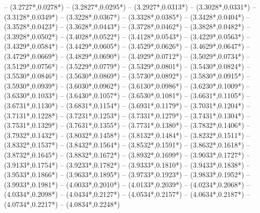{	-- ({3.2727*\dx},{0.0278*\dy})
	-- ({3.2827*\dx},{0.0295*\dy})
	-- ({3.2927*\dx},{0.0313*\dy})
	-- ({3.3028*\dx},{0.0331*\dy})
	-- ({3.3128*\dx},{0.0349*\dy})
	-- ({3.3228*\dx},{0.0367*\dy})
	-- ({3.3328*\dx},{0.0385*\dy})
	-- ({3.3428*\dx},{0.0404*\dy})
	-- ({3.3528*\dx},{0.0423*\dy})
	-- ({3.3628*\dx},{0.0443*\dy})
	-- ({3.3728*\dx},{0.0462*\dy})
	-- ({3.3828*\dx},{0.0482*\dy})
	-- ({3.3928*\dx},{0.0502*\dy})
	-- ({3.4028*\dx},{0.0522*\dy})
	-- ({3.4128*\dx},{0.0543*\dy})
	-- ({3.4229*\dx},{0.0563*\dy})
	-- ({3.4329*\dx},{0.0584*\dy})
	-- ({3.4429*\dx},{0.0605*\dy})
	-- ({3.4529*\dx},{0.0626*\dy})
	-- ({3.4629*\dx},{0.0647*\dy})
	-- ({3.4729*\dx},{0.0669*\dy})
	-- ({3.4829*\dx},{0.0690*\dy})
	-- ({3.4929*\dx},{0.0712*\dy})
	-- ({3.5029*\dx},{0.0734*\dy})
	-- ({3.5129*\dx},{0.0756*\dy})
	-- ({3.5229*\dx},{0.0779*\dy})
	-- ({3.5329*\dx},{0.0801*\dy})
	-- ({3.5430*\dx},{0.0824*\dy})
	-- ({3.5530*\dx},{0.0846*\dy})
	-- ({3.5630*\dx},{0.0869*\dy})
	-- ({3.5730*\dx},{0.0892*\dy})
	-- ({3.5830*\dx},{0.0915*\dy})
	-- ({3.5930*\dx},{0.0939*\dy})
	-- ({3.6030*\dx},{0.0962*\dy})
	-- ({3.6130*\dx},{0.0986*\dy})
	-- ({3.6230*\dx},{0.1009*\dy})
	-- ({3.6330*\dx},{0.1033*\dy})
	-- ({3.6430*\dx},{0.1057*\dy})
	-- ({3.6530*\dx},{0.1081*\dy})
	-- ({3.6631*\dx},{0.1105*\dy})
	-- ({3.6731*\dx},{0.1130*\dy})
	-- ({3.6831*\dx},{0.1154*\dy})
	-- ({3.6931*\dx},{0.1179*\dy})
	-- ({3.7031*\dx},{0.1204*\dy})
	-- ({3.7131*\dx},{0.1228*\dy})
	-- ({3.7231*\dx},{0.1253*\dy})
	-- ({3.7331*\dx},{0.1279*\dy})
	-- ({3.7431*\dx},{0.1304*\dy})
	-- ({3.7531*\dx},{0.1329*\dy})
	-- ({3.7631*\dx},{0.1355*\dy})
	-- ({3.7731*\dx},{0.1380*\dy})
	-- ({3.7832*\dx},{0.1406*\dy})
	-- ({3.7932*\dx},{0.1432*\dy})
	-- ({3.8032*\dx},{0.1458*\dy})
	-- ({3.8132*\dx},{0.1484*\dy})
	-- ({3.8232*\dx},{0.1511*\dy})
	-- ({3.8332*\dx},{0.1537*\dy})
	-- ({3.8432*\dx},{0.1564*\dy})
	-- ({3.8532*\dx},{0.1591*\dy})
	-- ({3.8632*\dx},{0.1618*\dy})
	-- ({3.8732*\dx},{0.1645*\dy})
	-- ({3.8832*\dx},{0.1672*\dy})
	-- ({3.8932*\dx},{0.1699*\dy})
	-- ({3.9033*\dx},{0.1727*\dy})
	-- ({3.9133*\dx},{0.1754*\dy})
	-- ({3.9233*\dx},{0.1782*\dy})
	-- ({3.9333*\dx},{0.1810*\dy})
	-- ({3.9433*\dx},{0.1838*\dy})
	-- ({3.9533*\dx},{0.1866*\dy})
	-- ({3.9633*\dx},{0.1895*\dy})
	-- ({3.9733*\dx},{0.1923*\dy})
	-- ({3.9833*\dx},{0.1952*\dy})
	-- ({3.9933*\dx},{0.1981*\dy})
	-- ({4.0033*\dx},{0.2010*\dy})
	-- ({4.0133*\dx},{0.2039*\dy})
	-- ({4.0234*\dx},{0.2068*\dy})
	-- ({4.0334*\dx},{0.2098*\dy})
	-- ({4.0434*\dx},{0.2127*\dy})
	-- ({4.0534*\dx},{0.2157*\dy})
	-- ({4.0634*\dx},{0.2187*\dy})
	-- ({4.0734*\dx},{0.2217*\dy})
	-- ({4.0834*\dx},{0.2248*\dy})
}
